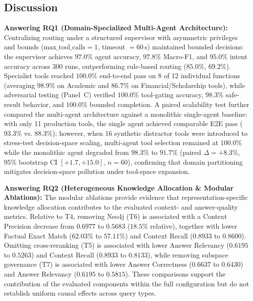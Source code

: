 \subsection{Discussion}
\label{sec:discussion}

\textbf{Answering RQ1 (Domain-Specialized Multi-Agent Architecture):} Centralizing routing under a structured supervisor with asymmetric privileges and bounds ($\text{max\_tool\_calls}=1$, timeout $=60\,\text{s}$) maintained bounded decisions: the supervisor achieves $97.0\%$ agent accuracy, $97.8\%$ Macro-F1, and $95.0\%$ intent accuracy across 300 runs, outperforming rule-based routing ($85.0\%$, $69.2\%$). Specialist tools reached $100.0\%$ end-to-end pass on 8 of 12 individual functions (averaging $98.9\%$ on Academic and $86.7\%$ on Financial/Scholarship tools), while adversarial testing (Panel~C) verified $100.0\%$ tool-gating accuracy, $98.3\%$ safe-result behavior, and $100.0\%$ bounded completion. A paired scalability test further compared the multi-agent architecture against a monolithic single-agent baseline: with only 11 production tools, the single agent achieved comparable E2E pass ($93.3\%$ vs. $88.3\%$); however, when 16 synthetic distractor tools were introduced to stress-test decision-space scaling, multi-agent tool selection remained at $100.0\%$ while the monolithic agent degraded from $98.3\%$ to $91.7\%$ (paired $\Delta=+8.3\%$, 95\% bootstrap CI $[+1.7, +15.0]$, $n=60$), confirming that domain partitioning mitigates decision-space pollution under tool-space expansion.

\textbf{Answering RQ2 (Heterogeneous Knowledge Allocation \& Modular Ablations):} The modular ablations provide evidence that representation-specific knowledge allocation contributes to the evaluated context- and answer-quality metrics. Relative to T4, removing Neo4j (T6) is associated with a Context Precision decrease from $0.6977$ to $0.5683$ ($18.5\%$ relative), together with lower Factual Exact Match ($62.03\%$ to $57.11\%$) and Context Recall ($0.8933$ to $0.8600$). Omitting cross-reranking (T5) is associated with lower Answer Relevancy ($0.6195$ to $0.5263$) and Context Recall ($0.8933$ to $0.8133$), while removing subspace governance (T7) is associated with lower Answer Correctness ($0.6637$ to $0.6430$) and Answer Relevancy ($0.6195$ to $0.5815$). These comparisons support the contribution of the evaluated components within the full configuration but do not establish uniform causal effects across query types.


